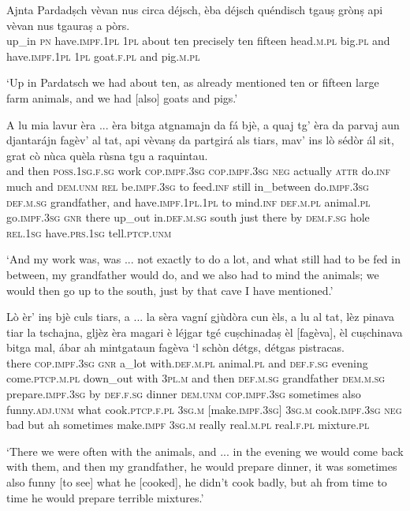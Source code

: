 \begin{linenumbers}
\gll  Ajnta Pardadṣch vèvan nus circa déjsch, èba déjsch quéndisch tgauṣ grònṣ api vèvan nus tgauraṣ a pòrs.  \\
up\_in \textsc{pn} have.\textsc{impf.1pl} \textsc{1pl} about ten precisely ten fifteen head.\textsc{m.pl} big.\textsc{pl} and have.\textsc{impf.1pl} \textsc{1pl} goat.\textsc{f.pl} and pig.\textsc{m.pl} \\
\end{linenumbers}
\medskip
\glt `Up in Pardatsch we had about ten, as already mentioned ten or fifteen large farm animals, and we had [also] goats and pigs.'
\medskip

\begin{linenumbers}
\gll A lu mia lavur èra ... èra bitga atgnamajn da fá bjè, a quaj tg’ èra da parvaj aun djantarájn fagèv’ al tat, api vèvanṣ da partgirá als tiars, mav’ ins lò sédòr ál sit, grat cò nùca quèla rùsna tgu a raquintau.\\
and then \textsc{poss.1sg.f.sg} work \textsc{cop.impf.3sg} {} \textsc{cop.impf.3sg} \textsc{neg} actually \textsc{attr} do.\textsc{inf} much and \textsc{dem.unm} \textsc{rel} be.\textsc{impf.3sg} to feed.\textsc{inf} still in\_between do.\textsc{impf.3sg} \textsc{def.m.sg} grandfather, and have.\textsc{impf.1pl.1pl} to mind.\textsc{inf} \textsc{def.m.pl} animal.\textsc{pl} go.\textsc{impf.3sg} \textsc{gnr} there up\_out in.\textsc{def.m.sg} south just there by \textsc{dem.f.sg} hole \textsc{rel.1sg} have.\textsc{prs.1sg} tell.\textsc{ptcp.unm}\\  
\end{linenumbers}
\medskip
\glt `And my work was, was ... not exactly to do a lot, and what still had to be fed in between, my grandfather would do, and we also had to mind the animals; we would then go up to the south, just by that cave I have mentioned.'
\medskip

\begin{linenumbers}
\gll  Lò èr’ inṣ bjè culs tiars, a ... la sèra vagní gjùdòra cun èls, a lu al tat, lèz pinava tiar la tschajna, gljèz èra magari è léjgar tgé cuṣchinadaṣ èl [fagèva], èl cuṣchinava bitga mal, ábar ah mintgataun fagèva `l schòn détgs, détgas pistracas.\\
there \textsc{cop.impf.3sg} \textsc{gnr} a\_lot  with.\textsc{def.m.pl} animal.\textsc{pl} and {} \textsc{def.f.sg} evening  come.\textsc{ptcp.m.pl} down\_out with \textsc{3pl.m} and then \textsc{def.m.sg} grandfather \textsc{dem.m.sg} prepare.\textsc{impf.3sg} by \textsc{def.f.sg} dinner \textsc{dem.unm} \textsc{cop.impf.3sg} sometimes also funny.\textsc{adj.unm} what cook.\textsc{ptcp.f.pl} \textsc{3sg.m} [make.\textsc{impf.3sg}] \textsc{3sg.m} cook.\textsc{impf.3sg} \textsc{neg} bad but ah sometimes make.\textsc{impf} \textsc{3sg.m} really real.\textsc{m.pl} real.\textsc{f.pl} mixture.\textsc{pl}\\
\end{linenumbers}
\medskip
\glt `There we were often with the animals, and ... in the evening we would come back with them, and then my grandfather, he would prepare dinner, it was sometimes also funny [to see] what he [cooked], he didn’t cook badly, but ah from time to time he would prepare terrible mixtures.'
\medskip

